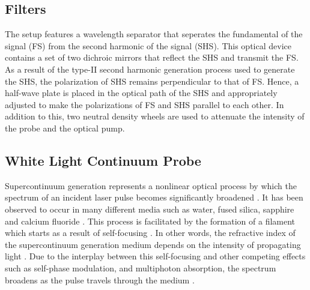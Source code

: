 \subsection{Filters}

The setup features a wavelength separator that seperates the fundamental of the signal (FS) from the second harmonic of the signal (SHS). This optical device contains a set of two dichroic mirrors that reflect the SHS and transmit the FS. As a result of the type-II second harmonic generation process used to generate the SHS, the polarization of SHS remains perpendicular to that of FS. Hence, a half-wave plate is placed in the optical path of the SHS and appropriately adjusted to make the polarizations of FS and SHS parallel to each other. In addition to this, two neutral density wheels are used to attenuate the intensity of the probe and the optical pump.

\subsection{White Light Continuum Probe}

\label{section:white_light_probe}
Supercontinuum generation represents a nonlinear optical process by which the spectrum of an incident laser pulse becomes significantly broadened \cite{dubietis2017ultrafast}. It has been observed to occur in many different media such as water, fused silica, sapphire and calcium fluoride \cite{dubietis2017ultrafast}. This process is facilitated by the formation of a filament which starts as a result of self-focusing \cite{dubietis2017ultrafast}. In other words, the refractive index of the supercontinuum generation medium depends on the intensity of propagating light \cite{dubietis2017ultrafast}. Due to the interplay between this self-focusing and other competing effects such as self-phase modulation, and multiphoton absorption, the spectrum  broadens as the pulse travels through the medium \cite{dubietis2017ultrafast}. 

